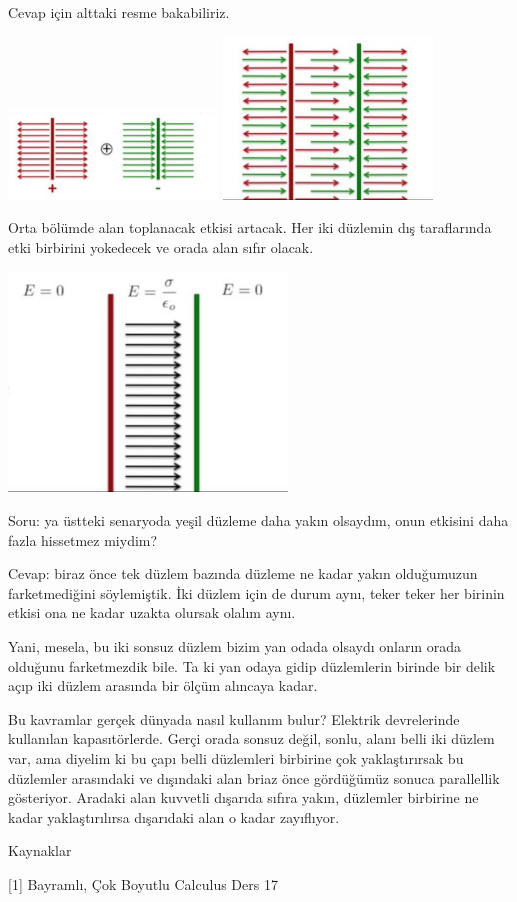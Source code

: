 \documentclass[12pt,fleqn]{article}\usepackage{../../common}
\begin{document}
Cevap için alttaki  resme bakabiliriz. 

\includegraphics[width=15em]{06_11.jpg}
\includegraphics[width=15em]{06_12.jpg}

Orta bölümde alan toplanacak etkisi artacak. Her iki düzlemin dış taraflarında
etki birbirini yokedecek ve orada alan sıfır olacak.

\includegraphics[width=20em]{06_13.jpg}

Soru: ya üstteki senaryoda yeşil düzleme daha yakın olsaydım, onun etkisini daha
fazla hissetmez miydim?

Cevap: biraz önce tek düzlem bazında düzleme ne kadar yakın olduğumuzun
farketmediğini söylemiştik. İki düzlem için de durum aynı, teker teker her
birinin etkisi ona ne kadar uzakta olursak olalım aynı.

Yani, mesela, bu iki sonsuz düzlem bizim yan odada olsaydı onların orada
olduğunu farketmezdik bile. Ta ki yan odaya gidip düzlemlerin birinde bir delik
açıp iki düzlem arasında bir ölçüm alıncaya kadar.

Bu kavramlar gerçek dünyada nasıl kullanım bulur? Elektrik devrelerinde
kullanılan kapasıtörlerde. Gerçi orada sonsuz değil, sonlu, alanı belli iki
düzlem var, ama diyelim ki bu çapı belli düzlemleri birbirine çok yaklaştırırsak
bu düzlemler arasındaki ve dışındaki alan briaz önce gördüğümüz sonuca
parallellik gösteriyor. Aradaki alan kuvvetli dışarıda sıfıra yakın, düzlemler
birbirine ne kadar yaklaştırılırsa dışarıdaki alan o kadar zayıflıyor. 

Kaynaklar

[1] Bayramlı, Çok Boyutlu Calculus Ders 17
\end{document}
